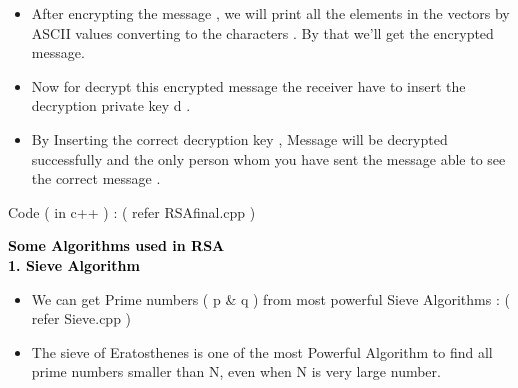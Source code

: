 \documentclass{article}
\begin{document}
\begin{tcolorbox}
\begin{itemize}
\item After encrypting the message , we will print all the elements in the vectors by ASCII values converting to the characters . By that we'll get the encrypted message.
\end{itemize}

\begin{itemize}
\item Now for decrypt this encrypted message the receiver have to insert the decryption private key d .
\end{itemize}

\begin{itemize}
\item By Inserting the correct decryption key , Message will be decrypted successfully and the only person whom you have sent the message able to see the correct message .\\
\end{itemize}

\end{tcolorbox}

Code ( in c++ ) : ( refer RSAfinal.cpp )
\pagebreak

\centering\textbf{{\LARGE \bf \textcolor{black}{Some Algorithms used in RSA}\\}}
\vspace{1cm}
\centering\textbf{{\LARGE \bf \textcolor{black}{1. Sieve Algorithm}\\}}
\vspace{1cm}
\begin{itemize}
\item We can get Prime numbers ( p \& q ) from most powerful Sieve Algorithms :  ( refer Sieve.cpp ) 
\end{itemize}

\begin{tcolorbox}
\begin{itemize}
\item The sieve of Eratosthenes is one of the most Powerful Algorithm to find all prime numbers smaller than N, even when N is very large number.\\
\end{itemize}
\end{tcolorbox}
\vspace{1cm}
\end{document}
